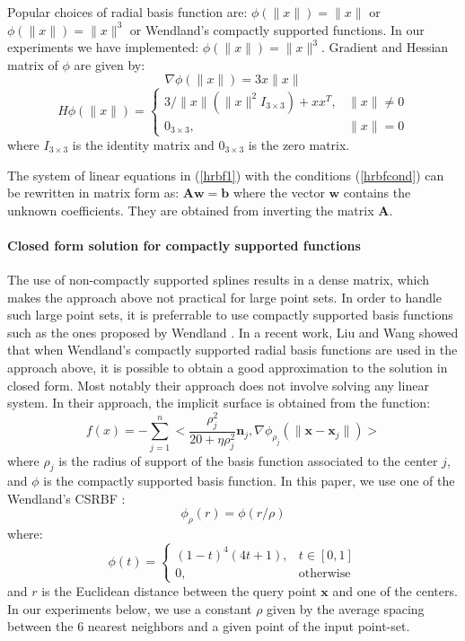 \documentclass[ams]{U-AizuGT}
\def\x{\mathbf{x}}
\def\n{\mathbf{n}}
\begin{document}
Popular choices of radial basis function are: 
$\phi(\|x\|) = \|x\|$ or $\phi(\|x\|) = \|x\|^3$ or Wendland's compactly supported functions.
In our experiments we have implemented: $\phi(\|x\|) = \|x\|^3$.
Gradient and Hessian matrix of $\phi$ are given by:
\[\nabla\phi(\|x\|) = 3x\|x\|\]
\[ H \phi (\|x\|)= \left\{ \begin{array}{ll} 3/\|x\|(\|x\|^2I_{3\times3}) + xx^T, & \|x\| \neq 0\\ 
0_{3\times3}, &\|x\| = 0 \end{array}\right.\]
where $I_{3\times3}$ is the identity matrix and $0_{3\times3}$ is the zero matrix.

The system of linear equations in (\ref{hrbf1}) with the conditions (\ref{hrbfcond}) can be 
rewritten in matrix form as:
$\mathbf{A} \mathbf{w} = \mathbf{b}$
where the vector $\mathbf{w}$ contains the unknown coefficients. 
They are obtained from inverting the matrix $\mathbf{A}$.

\paragraph{Closed form solution for compactly supported functions}
The use of non-compactly supported splines results in a dense matrix, 
which makes the approach above not practical for large point sets.
In order to handle such large point sets, it is preferrable to use 
compactly supported basis functions such as the ones proposed 
by Wendland \cite{MGV11}. 
In a recent work, Liu and Wang \cite{LW15} showed that when Wendland's 
compactly supported radial basis functions are used in the approach above, 
it is possible to obtain a good approximation to the solution in closed form.
Most notably their approach does not involve solving any linear system.
In their approach, the implicit surface is obtained from the function:  
\begin{equation} \label{hrbfclosed}
f(x)=-\sum_{j=1}^n<\frac{\rho^2_j}{20+\eta\rho^2_j} \n_j, \nabla\phi_{\rho_j}(\|\x-\x_j\|)>
\end{equation}
where $\rho_j$ is the radius of support of the basis function associated to the center $j$, 
and $\phi$ is the compactly supported basis function. 
In this paper, we use one of the Wendland's CSRBF \cite{WP95}: 
\[
\phi_{\rho}(r)=\phi(r/\rho)
\]
where:
\[
\phi (t)= \left\{ \begin{array}{ll} (1-t)^{4}(4t+1), & t \in [0,1]\\ 
0, & \text{otherwise} \end{array}\right.
\]
and $r$ is the Euclidean distance between the query point $\x$ and one of 
the centers.
In our experiments below, we use a constant $\rho$ given by 
the average spacing between the $6$ nearest neighbors and a given point 
of the input point-set. 
\end{document}
